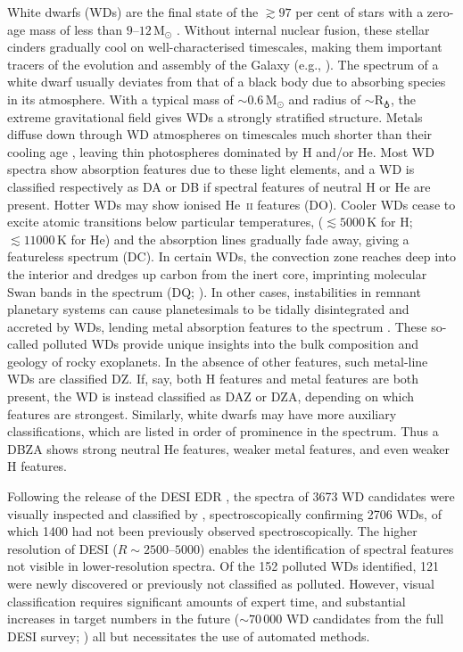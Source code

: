 \documentclass[fleqn,usenatbib]{mnras}
\begin{document}
White dwarfs (WDs) are the final state of the $\gtrsim97$ per cent of stars with a zero-age mass of less than $9$--$12\,\mathrm{M}_\odot$ \citep{lauffer18, althaus10, althaus21}.
Without internal nuclear fusion, these stellar cinders gradually cool on well-characterised timescales, making them important tracers of the evolution and assembly of the Galaxy (e.g., \citealt{winget87, tremblay14}).
The spectrum of a white dwarf usually deviates from that of a black body due to absorbing species in its atmosphere.
With a typical mass of $\sim0.6\,\mathrm{M}_\odot$ and radius of $\sim \mathrm{R}_{\earth}$, the extreme gravitational field gives WDs a strongly stratified structure.
Metals diffuse down through WD atmospheres on timescales much shorter than their cooling age \citep{schatzman45, paquette86, koester09, wyatt14}, leaving thin photospheres dominated by H and/or He.
Most WD spectra show absorption features due to these light elements, and a WD is classified respectively as DA or DB if spectral features of neutral H or He are present.
Hotter WDs may show ionised  He~\textsc{ii} features (DO).
Cooler WDs cease to excite atomic transitions below particular temperatures, ($\lesssim5000\,\text{K}$ for H; $\lesssim 11000\,\text{K}$ for He) and the absorption lines gradually fade away, giving a featureless spectrum (DC).
In certain WDs, the convection zone reaches deep into the interior and dredges up carbon from the inert core, imprinting molecular  Swan bands in the spectrum (DQ; \citealt{fontaine84, koester82, koester20, blouin23}).
In other cases, instabilities in remnant planetary systems can cause planetesimals to be tidally disintegrated and accreted by WDs, lending metal absorption features to the spectrum \citep{bonsor11, frewen14, mustill18, maldonado20}.
These so-called polluted WDs provide unique insights into the bulk composition and geology of rocky exoplanets.
In the absence of other features, such metal-line WDs are classified DZ.
If, say, both H features and metal features are both present, the WD is instead classified as DAZ or DZA, depending on which features are strongest.
Similarly, white dwarfs may have more auxiliary classifications, which are listed in order of prominence in the spectrum.
Thus a DBZA shows strong neutral He features, weaker metal features, and even weaker H features.

Following the release of the DESI EDR \citep{desiedr}, the spectra of 3673 WD candidates were visually inspected and classified by \citet{manser24}, spectroscopically confirming 2706 WDs, of which 1400 had not been previously observed spectroscopically.
The higher resolution of DESI ($R\sim2500$--$5000$) enables the identification of spectral features not visible in lower-resolution spectra.
Of the 152 polluted WDs identified, 121 were newly discovered or previously not classified as polluted.
However, visual classification requires significant amounts of expert time, and substantial increases in target numbers in the future ($\sim70\,000$ WD candidates from the full DESI survey; \citealt{cooper23}) all but necessitates the use of automated methods.
\end{document}
